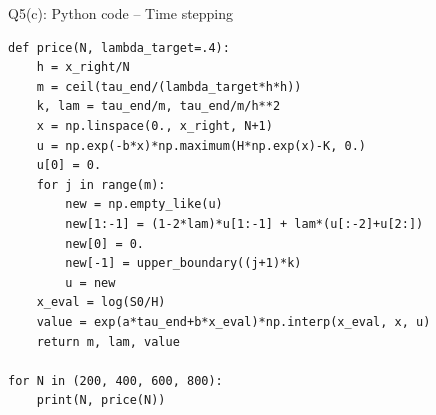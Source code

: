\documentclass{beamer}
\begin{document}
\begin{frame}[fragile]{Q5(c): Python code -- Time stepping}
\begin{lstlisting}
def price(N, lambda_target=.4):
    h = x_right/N
    m = ceil(tau_end/(lambda_target*h*h))
    k, lam = tau_end/m, tau_end/m/h**2
    x = np.linspace(0., x_right, N+1)
    u = np.exp(-b*x)*np.maximum(H*np.exp(x)-K, 0.)
    u[0] = 0.
    for j in range(m):
        new = np.empty_like(u)
        new[1:-1] = (1-2*lam)*u[1:-1] + lam*(u[:-2]+u[2:])
        new[0] = 0.
        new[-1] = upper_boundary((j+1)*k)
        u = new
    x_eval = log(S0/H)
    value = exp(a*tau_end+b*x_eval)*np.interp(x_eval, x, u)
    return m, lam, value

for N in (200, 400, 600, 800):
    print(N, price(N))
\end{lstlisting}
\end{frame}
\end{document}
